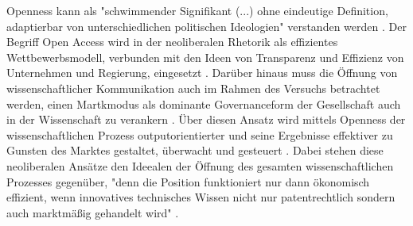 Openness kann als "schwimmender Signifikant (...) ohne eindeutige Definition, adaptierbar von unterschiedlichen politischen Ideologien" verstanden werden \cite{Adema_2014_open_access}. Der Begriff Open Access wird in der neoliberalen Rhetorik als effizientes Wettbewerbsmodell, verbunden mit den Ideen von Transparenz und Effizienz von Unternehmen und Regierung, eingesetzt \cite{tkacz_2012_open}. Darüber hinaus muss die Öffnung von wissenschaftlicher Kommunikation auch im Rahmen des Versuchs betrachtet werden, einen Martkmodus als dominante Governanceform der Gesellschaft auch in der Wissenschaft zu verankern \cite[:152]{troy_2012_wissen}. Über diesen Ansatz wird mittels Openness der wissenschaftlichen Prozess outputorientierter und seine Ergebnisse effektiver zu Gunsten des Marktes gestaltet, überwacht und gesteuert \cite{adema_2010_oaoverview}. Dabei stehen diese neoliberalen Ansätze den Ideealen der Öffnung des gesamten wissenschaftlichen Prozesses gegenüber, "denn die Position funktioniert nur dann ökonomisch effizient, wenn innovatives technisches Wissen nicht nur patentrechtlich sondern auch marktmäßig gehandelt wird" \cite[:179]{troy_2012_wissen}.

